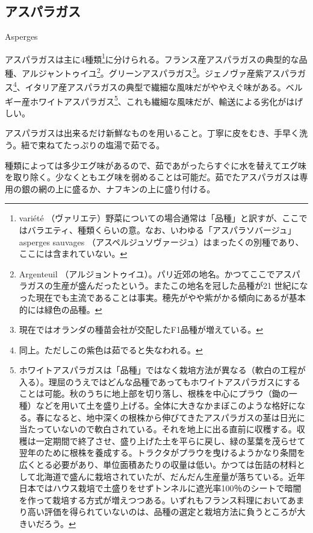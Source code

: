 \begin{main}

\hypertarget{asperges}{%
\subsection{アスパラガス}\label{asperges}}

\begin{frsecbenv}

Asperges

\end{frsecbenv}

アスパラガスは主に4種類\footnote{variété
  （ヴァリエテ）野菜についての場合通常は「品種」と訳すが、ここではバラエティ、種類くらいの意。なお、いわゆる「アスパラソバージュ」asperges
  sauvages
  （アスペルジュソヴァージュ）はまったくの別種であり、ここには含まれていない。}に分けられる。フランス産アスパラガスの典型的な品種、アルジャントゥイユ\footnote{Argenteuil
  （アルジョントゥイユ）。パリ近郊の地名。かつてここでアスパラガスの生産が盛んだったという。またこの地名を冠した品種が21
  世紀になった現在でも主流であることは事実。穂先がやや紫がかる傾向にあるが基本的には緑色の品種。}。グリーンアスパラガス\footnote{現在ではオランダの種苗会社が交配したF1品種が増えている。}。ジェノヴァ産紫アスパラガス\footnote{同上。ただしこの紫色は茹でると失なわれる。}、イタリア産アスパラガスの典型で繊細な風味だがややえぐ味がある。ベルギー産ホワイトアスパラガス\footnote{ホワイトアスパラガスは「品種」ではなく栽培方法が異なる（軟白の工程が入る）。理屈のうえではどんな品種であってもホワイトアスパラガスにすることは可能。秋のうちに地上部を切り落し、根株を中心にプラウ（鋤の一種）などを用いて土を盛り上げる。全体に大きなかまぼこのような格好になる。春になると、地中深くの根株から伸びてきたアスパラガスの茎は日光に当たっていないので軟白されている。それを地上に出る直前に収穫する。収穫は一定期間で終了させ、盛り上げた土を平らに戻し、緑の茎葉を茂らせて翌年のために根株を養成する。トラクタがプラウを曳けるようかなり条間を広くとる必要があり、単位面積あたりの収量は低い。かつては缶詰の材料として北海道で盛んに栽培されていたが、だんだん生産量が落ちている。近年日本ではハウス栽培で土盛りをせずトンネルに遮光率100％のシートで暗闇を作って栽培する方式が増えつつある。いずれもフランス料理においてあまり高い評価を得られていないのは、品種の選定と栽培方法に負うところが大きいだろう。}、これも繊細な風味だが、輸送による劣化がはげしい。

アスパラガスは出来るだけ新鮮なものを用いること。丁寧に皮をむき、手早く洗う。紐で束ねてたっぷりの塩湯で茹でる。

種類によっては多少エグ味があるので、茹であがったらすぐに水を替えてエグ味を取り除く。少なくともエグ味を弱めることは可能だ。茹でたアスパラガスは専用の銀の網の上に盛るか、ナフキンの上に盛り付ける。

\end{main}

